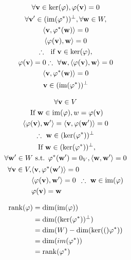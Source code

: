 \documentclass{mathtoolkit}
\begin{document}
\begin{p}
\begin{subp}
      \item
        \begin{gather*}
          \forall \vec{v} \in \ker{\varphi}, \varphi(\vec{v}) = 0 \\
          \forall \vec{v'} \in (\im{\varphi^*})^\perp, \forall \vec{w} \in W, \\
          \ip{\vec{v}}{\varphi^*(\vec{w})} = 0 \\
          \ip{\varphi(\vec{v})}{\vec{w}} = 0 \\
          \therefore \text{if} \vec{v} \in \ker{\varphi}, \\
          \varphi(\vec{v}) = 0
          \therefore \forall \vec{w}, \ip{\varphi(\vec{v})}{\vec{w}} = 0 \\
                                      \ip{\vec{v}}{\varphi^*(\vec{w})} = 0 \\
                                      \vec{v} \in (\im{\varphi^*})^\perp \\
        \end{gather*}

      \item
        \begin{gather*}
          \forall \vec{v} \in V \\
          \text{If} \vec{w} \in \im{\varphi}, w = \varphi(\vec{v}) \\
          \ip{\varphi(\vec{v})}{\vec{w}'} = \ip{\vec{v}}{\varphi(\vec{w}')} = 0 \\
          \therefore \vec{w} \in (\ker{\varphi^*})^\perp \\
          \text{If} \vec{w} \in (\ker{\varphi^*})^\perp, \\
          \forall \vec{w}' \in W \st \varphi^*(\vec{w}') = 0_V, \ip{\vec{w}}{\vec{w}'} = 0 \\
          \begin{aligned}
            \forall \vec{v} \in V,
              & \ip{\vec{v}}{\varphi^*(\vec{w}')} = 0 \\
              & \ip{\varphi(\vec{v})}{\vec{w}'} = 0 \\
              & \varphi(\vec{v}) = \vec{w}
          \end{aligned}
          \therefore \vec{w} \in \im{\varphi}
        \end{gather*}

      \item
        \begin{align*}
          \mathrm{rank}(\varphi)
          & = \mathrm{dim}(\mathrm{im}(\varphi)) \\
          & = \mathrm{dim}((\mathrm{ker}(\varphi^*))^\perp) \\
          & = \mathrm{dim}(W) - \mathrm{dim}(\mathrm{ker}(()\varphi^*)) \\
          & = \mathrm{dim}(im(\varphi^*)) \\
          & = \mathrm{rank}(\varphi^*)
        \end{align*}


\end{subp}
\end{p}
\end{document}
